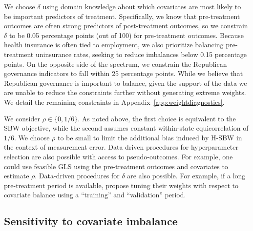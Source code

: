 \documentclass[aoas]{imsart}
\theoremstyle{plain}
\theoremstyle{remark}
\begin{document}
We choose $\delta$ using domain knowledge about which covariates are most likely to be important predictors of treatment. Specifically, we know that pre-treatment outcomes are often strong predictors of post-treatment outcomes, so we constrain $\delta$ to be 0.05 percentage points (out of 100) for pre-treatment outcomes. Because health insurance is often tied to employment, we also prioritize balancing pre-treatment uninsurance rates, seeking to reduce imbalances below 0.15 percentage points. On the opposite side of the spectrum, we constrain the Republican governance indicators to fall within 25 percentage points. While we believe that Republican governance is important to balance, given the support of the data we are unable to reduce the constraints further without generating extreme weights. We detail the remaining constraints in Appendix~\ref{app:weightdiagnostics}. 

We consider $\rho \in \{0, 1/6\}$. As noted above, the first choice is equivalent to the SBW objective, while the second assumes constant within-state equicorrelation of $1/6$. We choose $\rho$ to be small to limit the additional bias induced by H-SBW in the context of measurement error. Data driven procedures for hyperparameter selection are also possible with access to pseudo-outcomes. For example, one could use feasible GLS using the pre-treatment outcomes and covariates to estimate $\rho$. Data-driven procedures for $\delta$ are also possible. For example, if a long pre-treatment period is available, \cite{abadie2015comparative} propose tuning their weights with respect to covariate balance using a ``training'' and ``validation'' period.%

\subsection{Sensitivity to covariate imbalance}
\end{document}
